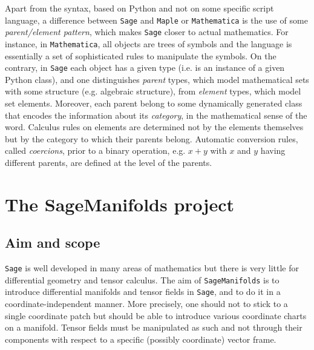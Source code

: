 \documentclass[a4paper]{jpconf}
\newcommand{\soft}[1]{\texttt{#1}}
\newcommand{\Sage}{\soft{Sage}}
\newcommand{\SM}{\soft{SageManifolds}}
\begin{document}
Apart from the syntax, based on Python and not on some specific script 
language, a difference between \Sage{} and \soft{Maple} or \soft{Mathematica}
is the use of some \emph{parent/element pattern}, which makes \Sage{} closer to 
actual mathematics. For instance, in \soft{Mathematica}, all objects 
are trees of symbols and the language is essentially a set of 
sophisticated rules to manipulate the symbols. On the contrary, in \Sage{}
each object has a given type (i.e. is an instance of a given Python class), 
and one distinguishes \emph{parent} types, which model mathematical
sets with some structure (e.g. algebraic structure), from \emph{element} types,
which model set elements. Moreover, each parent belong to some 
dynamically generated class that encodes the information 
about its \emph{category}, in the mathematical sense of the word.
Calculus rules on elements are determined not by the elements themselves
but by the category to which their parents belong. Automatic conversion rules, called \emph{coercions},
prior to a binary operation, e.g. $x+y$ with $x$ and $y$ having different 
parents, are defined at the level of the parents.


\section{The SageManifolds project}

\subsection{Aim and scope}

\Sage{} is well developed in many areas of mathematics but there is
very little for differential geometry and tensor calculus.
The aim of \SM{} \cite{SM} is to introduce differential manifolds and tensor fields
in \Sage{}, and to do it in a coordinate-independent manner. 
More precisely, one should not to stick to a single coordinate patch
but should be able to introduce various coordinate charts
on a manifold. Tensor fields must be manipulated as such and not through 
their components with respect to a specific (possibly coordinate) vector frame. 
\end{document}
